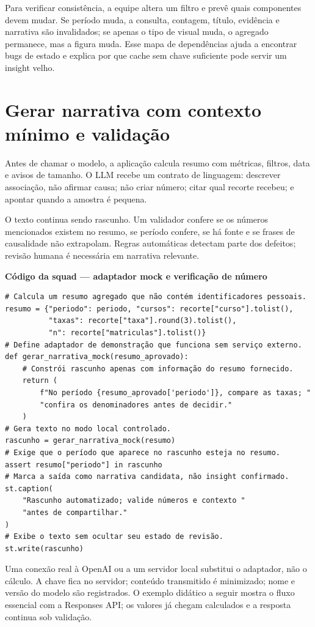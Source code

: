 Para verificar consistência, a equipe altera um filtro e prevê quais componentes devem mudar. Se período muda, a consulta, contagem, título, evidência e narrativa são invalidados; se apenas o tipo de visual muda, o agregado permanece, mas a figura muda. Esse mapa de dependências ajuda a encontrar bugs de estado e explica por que cache sem chave suficiente pode servir um insight velho.

\section{Gerar narrativa com contexto mínimo e validação}

Antes de chamar o modelo, a aplicação calcula resumo com métricas, filtros, data e avisos de tamanho. O LLM recebe um contrato de linguagem: descrever associação, não afirmar causa; não criar número; citar qual recorte recebeu; e apontar quando a amostra é pequena.

O texto continua sendo rascunho. Um validador confere se os números mencionados existem no resumo, se período confere, se há fonte e se frases de causalidade não extrapolam. Regras automáticas detectam parte dos defeitos; revisão humana é necessária em narrativa relevante.

\textbf{Código da squad --- adaptador mock e verificação de número}
\begin{verbatim}
# Calcula um resumo agregado que não contém identificadores pessoais.
resumo = {"periodo": periodo, "cursos": recorte["curso"].tolist(),
          "taxas": recorte["taxa"].round(3).tolist(),
          "n": recorte["matriculas"].tolist()}
# Define adaptador de demonstração que funciona sem serviço externo.
def gerar_narrativa_mock(resumo_aprovado):
    # Constrói rascunho apenas com informação do resumo fornecido.
    return (
        f"No período {resumo_aprovado['periodo']}, compare as taxas; "
        "confira os denominadores antes de decidir."
    )
# Gera texto no modo local controlado.
rascunho = gerar_narrativa_mock(resumo)
# Exige que o período que aparece no rascunho esteja no resumo.
assert resumo["periodo"] in rascunho
# Marca a saída como narrativa candidata, não insight confirmado.
st.caption(
    "Rascunho automatizado; valide números e contexto "
    "antes de compartilhar."
)
# Exibe o texto sem ocultar seu estado de revisão.
st.write(rascunho)
\end{verbatim}

Uma conexão real à OpenAI ou a um servidor local substitui o adaptador, não o cálculo. A chave fica no servidor; conteúdo transmitido é minimizado; nome e versão do modelo são registrados. O exemplo didático a seguir mostra o fluxo essencial com a Responses API; os valores já chegam calculados e a resposta continua sob validação.

